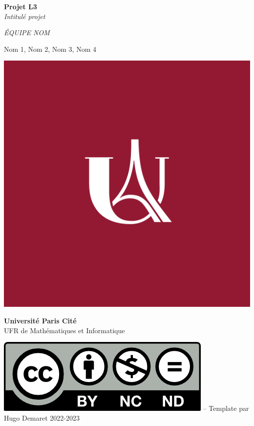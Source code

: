 \begin{titlepage}
    \begin{center}
        \vspace*{1cm}
        
        \Huge
        
        \textbf{Projet L3}\\
        \Large
        \textit{Intitulé projet}
        
        \vspace*{0.5cm}
        
        \Large
        \textit{\'EQUIPE NOM}
        
        \vspace{0.5cm}
        
        \normalsize
        Nom 1, Nom 2, Nom 3, Nom 4
        
        
        \vfill
        
        
        
    
        
        
        
        
        
        \vfill
        
    
        \includegraphics[scale=0.025]{titlepage/images/cover_image.png}
        
        \large
        \textbf{Université Paris Cité}\\
        UFR de Mathématiques et Informatique\\
    \end{center}
    
    \vspace{2cm}
    
    \includegraphics[scale=0.3]{titlepage/images/licence.png} -- Template par Hugo Demaret
    \hfill 
    2022-2023
\end{titlepage}